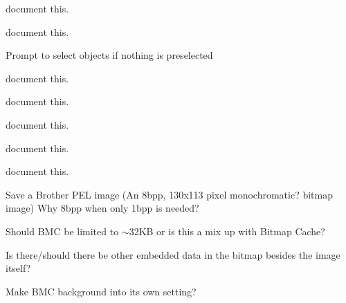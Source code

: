\begin{DoxyRefList}
%
document this.  
\item[Member \mbox{\hyperlink{imgui__main_8c_af79e738d67fcf5da0a50d6ea559d3b32}{RGB\+\_\+\+MODE\+\_\+\+BACKGROUND}} ]\label{todo__todo000217}%
%
document this.  
\item[Member \mbox{\hyperlink{imgui__main_8c_a644510fd1fda113a92ff678338657074}{rotate\+\_\+main}} (void)]\label{todo__todo000218}%
%
Prompt to select objects if nothing is preselected  
\item[Member \mbox{\hyperlink{imgui__main_8c_a778d491e9851372eed18d56bd73acc47}{rotate\+\_\+selected\+\_\+action}} (void)]\label{todo__todo000161}%
%
document this.  
\item[Member \mbox{\hyperlink{imgui__main_8c_ac616ca8468d7ccf756f08e335454aa44}{rotate\+Action}} (void)]\label{todo__todo000066}%
%
document this.  
\item[Member \mbox{\hyperlink{imgui__main_8c_a6c438df405b6d7180a3e20f42c37e0c9}{rounded\+\_\+rectangle\+\_\+action}} (void)]\label{todo__todo000147}%
%
document this.  
\item[Member \mbox{\hyperlink{imgui__main_8c_aabe2efa6627dbff786aa942b4d28220f}{rubber\+\_\+point\+\_\+action}} (void)]\label{todo__todo000130}%
%
document this.  
\item[Member \mbox{\hyperlink{imgui__main_8c_ae842547a55833564fee3ca58a87e61a7}{rubber\+\_\+text\+\_\+action}} (void)]\label{todo__todo000131}%
%
document this.  
\item[Member \mbox{\hyperlink{imgui__main_8c_ac3e2aeea61a03de723ef16125e9e08ea}{save\+\_\+bmc}} (void)]\label{todo__todo000014}%
%
Save a Brother PEL image (An 8bpp, 130x113 pixel monochromatic? bitmap image) Why 8bpp when only 1bpp is needed?

\label{todo__todo000015}%
%
Should BMC be limited to $\sim$32\+KB or is this a mix up with Bitmap Cache?

\label{todo__todo000016}%
%
Is there/should there be other embedded data in the bitmap besides the image itself?

\label{todo__todo000017}%
%
Make BMC background into it\textquotesingle{}s own setting?


\end{DoxyRefList}
